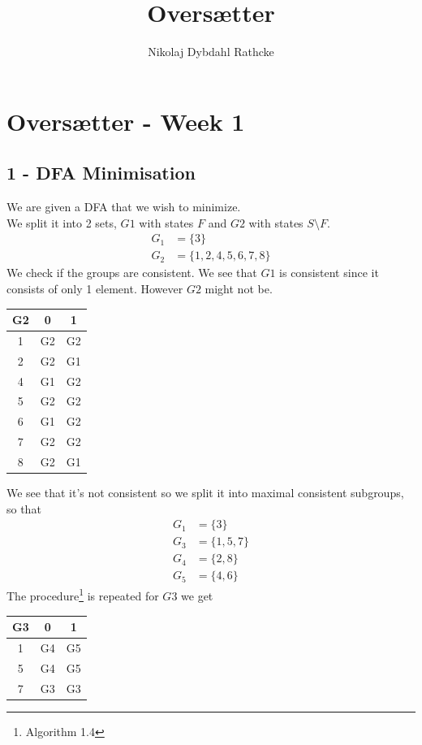 \documentclass[12pt]{article}
\title{Oversætter}
\author{Nikolaj Dybdahl Rathcke}
\begin{document}
\section*{Oversætter - Week 1}

\subsection*{1 - DFA Minimisation}
We are given a DFA that we wish to minimize.\\
We split it into 2 sets, $G1$ with states $F$ and $G2$ with states $S\setminus F$.
\begin{align*}
G_1 &= \{3\}\\
G_2 &= \{1,2,4,5,6,7,8\}
\end{align*}
We check if the groups are consistent. We see that $G1$ is consistent since it consists of only 1 element. However $G2$ might not be.
\begin{center}
\begin{tabular}{|c|c|c|}
\hline 
G2 & 0 & 1 \\ 
\hline 
1 & G2 & G2 \\ 
\hline 
2 & G2 & G1 \\ 
\hline 
4 & G1 & G2 \\ 
\hline 
5 & G2 & G2 \\ 
\hline 
6 & G1 & G2 \\ 
\hline 
7 & G2 & G2 \\ 
\hline 
8 & G2 & G1 \\ 
\hline 
\end{tabular}
\end{center}
We see that it's not consistent so we split it into maximal consistent subgroups, so that
\begin{align*}
G_1 &= \{3\}\\
G_3 &= \{1,5,7\}\\
G_4 &= \{2,8\}\\
G_5 &= \{4,6\}
\end{align*}
The procedure\footnote{Algorithm 1.4} is repeated for $G3$ we get
\begin{center}
\begin{tabular}{|c|c|c|}
\hline 
G3 & 0 & 1 \\ 
\hline 
1 & G4 & G5 \\ 
\hline 
5 & G4 & G5 \\ 
\hline 
7 & G3 & G3 \\ 
\hline 
\end{tabular}
\end{center}
\end{document}
